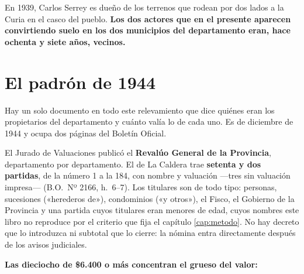 En 1939, Carlos Serrey es dueño de los terrenos que rodean por dos lados a la Curia en el
casco del pueblo. \textbf{Los dos actores que en el presente aparecen convirtiendo suelo en
los dos municipios del departamento eran, hace ochenta y siete años, vecinos.}

\section{El padrón de 1944}

Hay un solo documento en todo este relevamiento que dice quiénes eran los propietarios del
departamento y cuánto valía lo de cada uno. Es de diciembre de 1944 y ocupa dos páginas del
Boletín Oficial.

El Jurado de Valuaciones publicó el \textbf{Revalúo General de la Provincia}, departamento por
departamento. El de La Caldera trae \textbf{setenta y dos partidas}, de la número 1 a la
184, con nombre y valuación ---tres sin valuación impresa--- (B.O.\ Nº 2166, h.\ 6--7). Los titulares son de todo tipo: personas, sucesiones
(«herederos de»), condominios («y otros»), el Fisco, el Gobierno de la Provincia y una partida cuyos titulares eran menores de
edad, cuyos nombres este libro no reproduce por el criterio que fija el capítulo
\ref{cap:metodo}.
No hay decreto que lo introduzca ni subtotal que lo cierre: la
nómina entra directamente después de los avisos judiciales.

\textbf{Las dieciocho de \$6.400 o más concentran el grueso del valor:}

